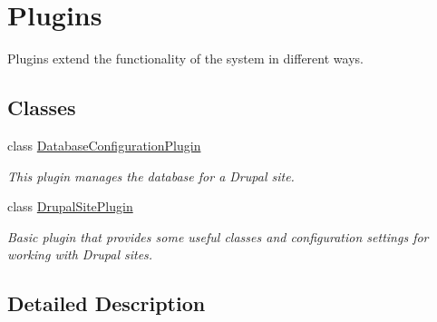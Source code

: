 \hypertarget{group__plugins}{\section{Plugins}
\label{group__plugins}
}


Plugins extend the functionality of the system in different ways.  


\subsection*{Classes}
\begin{DoxyCompactItemize}
\item 
class \hyperlink{classDatabaseConfigurationPlugin}{Database\-Configuration\-Plugin}
\begin{DoxyCompactList}\small\item\em This plugin manages the database for a Drupal site. \end{DoxyCompactList}\item 
class \hyperlink{classDrupalSitePlugin}{Drupal\-Site\-Plugin}
\begin{DoxyCompactList}\small\item\em Basic plugin that provides some useful classes and configuration settings for working with Drupal sites. \end{DoxyCompactList}\end{DoxyCompactItemize}


\subsection{Detailed Description}
